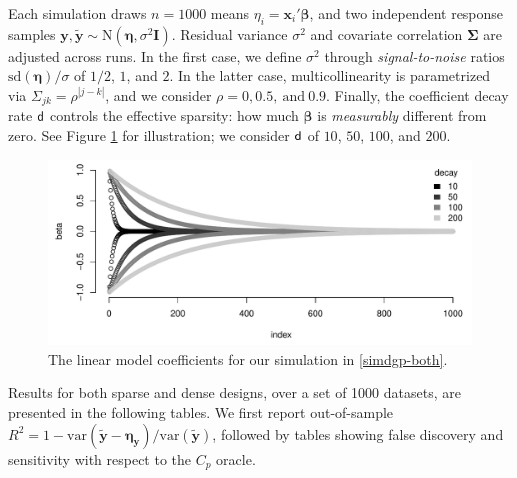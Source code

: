 \documentclass[12pt]{article}
\newcommand{\bs}[1]{\boldsymbol{#1}}
\newcommand{\mr}[1]{\mathrm{#1}}
\newcommand{\bm}[1]{\mathbf{#1}}
\begin{document}
\vspace{-.4cm}
\noindent
Each simulation draws $n=1000$ means $\eta_i =
\bm{x}_i'\bs{\beta}$, and two independent response samples 
$\bm{y},\bm{\tilde y} \sim \mr{N}(\bs{\eta},\sigma^2\bm{I})$. Residual
variance $\sigma^2$ and covariate correlation $\bs{\Sigma}$ are adjusted across
runs.  In the first case, we define $\sigma^2$ through {\it signal-to-noise}
ratios $\mr{sd}(\bs{\eta})/\sigma$ of $1/2$, $1$, and $2$.  In the latter
case, multicollinearity is parametrized via $\Sigma_{jk} =
\rho^{|j-k|}$, and we consider $\rho = 0, 0.5,~\text{and}~0.9$.
Finally, the coefficient decay rate ${\sf d}$ controls the effective sparsity: how much $\bs{\beta}$ is \textit{measurably} different from zero. See Figure \ref{fig:betadecay} for illustration; we consider
${\sf d}$ of $10$, $50$, $100$, and $200$.

\begin{figure}[h]\centering
\includegraphics[width=.8\textwidth]{graphs/betadecay}
\caption{\label{fig:betadecay} The linear model coefficients for our simulation in \ref{simdgp-both}.}
\end{figure}


Results for both sparse and dense designs, over a set of 1000 datasets, are presented in the following tables.  We first report out-of-sample $R^2 = 1 -
\mr{var}(\bm{\tilde y} - \bs{\eta}_\bm{y})/\mr{var}(\bm{\tilde y})$, followed by tables showing false discovery and sensitivity with respect to the $C_p$
oracle. 



\end{document}
